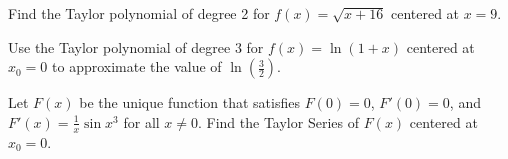 \documentclass{ximera}
\begin{document}
\begin{question}%

Find the Taylor polynomial of degree 2 for \(f(x) = \sqrt{x+16}\) centered at \(x=9\).
\begin{multiplechoice}
\end{multiplechoice}

\end{question}

\begin{question}%

Use the Taylor polynomial of degree \(3\) for \(f(x) = \ln (1+x)\) centered at \(x_0 = 0\) to approximate the value of \(\displaystyle \ln \left( \frac{3}{2} \right)\).
\begin{multiplechoice}
\end{multiplechoice}

\end{question}

\begin{question}%

Let \(F(x)\) be the unique function that satisfies \(F(0) = 0\), \(F'(0) = 0\), and \(F'(x) = \frac{1}{x} \sin x^3\) for all \(x \neq 0\). Find the Taylor Series of \(F(x)\) centered at \(x_0 = 0\).
\begin{multiplechoice}
\end{multiplechoice}

\end{question}
\end{document}
